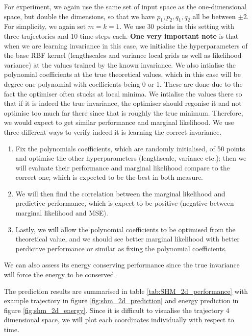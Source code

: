 \documentclass{statsmsc}
\begin{document}
For experiment, we again use the same set of input space as the one-dimensional space, but double the dimensions, so that we have $p_1, p_2, q_1, q_2$ all be between $\pm 2$. 
For simplicity, we again set $m=k=1$.
We use 30 points in this setting with three trajectories and 10 time steps each.
\textbf{One very important note} is that when we are learning invariance in this case, we initialise the hyperparameters of the base RBF kernel (lengthscales and variance local grids as well as likelihood variance) at the values trained by the known invariance.
We also intialise the polynomial coefficients at the true theoretical values, which in this case will be degree one polynomial with coefficients being 0 or 1.
These are done due to the fact the optimiser often stucks at local minima.
We intialise the values there so that if it is indeed the true invariance, the optimiser should regonise it and not optimise too much far there since that is roughly the true minimum.
Therefore, we would expect to get similar performance and marginal likelihood.
We use three different ways to verify indeed it is learning the correct invariance.
\begin{enumerate}
  \item Fix the polynomials coefficients, which are randomly initialised, of 50 points and optimise the other hyperparameters (lengthscale, variance etc.); then we will evaluate their performance and marginal likelihood compare to the correct one; which is expected to be the best in both measure. 
  \item We will then find the correlation between the marginal likelihood and predictive performance, which is expect to be positive (negative between marginal likelihood and MSE).
  \item Lastly, we will allow the polynomial coefficients to be optimised from the theoretical value, and we should see better marginal likelihood with better perdicitve performance or similar as fixing the polynomial coefficients.
\end{enumerate}

We can also assess its energy conserving performance since the true invariance will force the energy to be conserved. 

The prediction results are summarised in table \ref{tab:SHM_2d_performance} with example trajectory in figure \ref{fig:shm_2d_prediction} and energy prediction in figure \ref{fig:shm_2d_energy}.
Since it is difficult to visualise the trajectory 4 dimensional space, we will plot each coordinates individually with respect to time.
\end{document}
